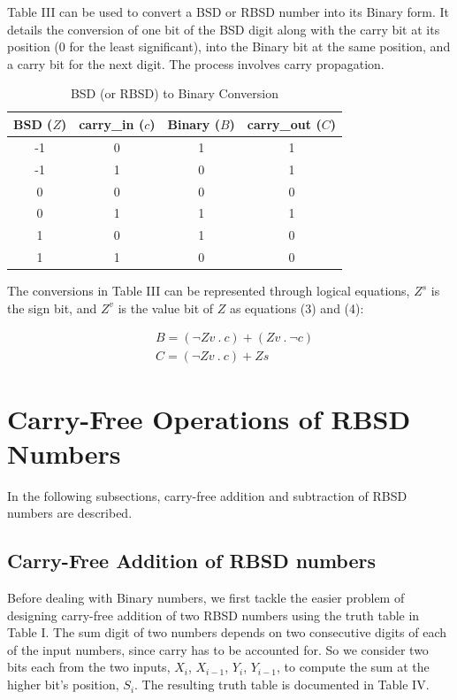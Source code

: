 \documentclass[conference]{IEEEtran_NCC}
\begin{document}
Table III can be used to convert a BSD or RBSD number into its Binary form. It details the conversion of one bit of the BSD digit along with the carry bit at its position (0 for the least significant), into the Binary bit at the same position, and a carry bit for the next digit. The process involves carry propagation.

\vspace{-.5em}
\begin{table}[h!]
  \centering
  \caption{BSD (or RBSD) to Binary Conversion}
  \label{tab:table3}
  \begin{tabular}{|c|c||c|c|}
    \hline
    BSD ($Z$) & carry\_in ($c$) & Binary ($B$) & carry\_out ($C$) \\
    \hline
    \hline
    -1 & 0 & 1 & 1\\
    \hline
    -1 & 1 & 0 & 1\\
    \hline
    0 & 0 & 0 & 0\\
    \hline
    0 & 1 & 1 & 1\\
    \hline
    1 & 0 & 1 & 0\\
    \hline
    1 & 1 & 0 & 0\\
    \hline
  \end{tabular}
\end{table}

The conversions in Table III can be represented through logical equations, $Z^{s}$ is the sign bit, and $Z^{v}$ is the value bit of $Z$ as equations (3) and (4):

\vspace{-1em}
\begin{align}
&B = (\neg Zv \ . \ c) + (Zv \ . \ \neg c) \\
&C = (\neg Zv \ . \ c) + Zs
\end{align}

\section{Carry-Free Operations of RBSD Numbers}

In the following subsections, carry-free addition and subtraction of RBSD numbers are described.

\subsection{Carry-Free Addition of RBSD numbers}

Before dealing with Binary numbers, we first tackle the easier problem of designing carry-free addition of two RBSD numbers using the truth table in Table I. The sum digit of two numbers depends on two consecutive digits of each of the input numbers, since carry has to be accounted for. So we consider two bits each from the two inputs, $X_{i}$, $X_{i-1}$, $Y_{i}$, $Y_{i-1}$, to compute the sum at the higher bit’s position, $S_{i}$. The resulting truth table is documented in Table IV.
\end{document}
